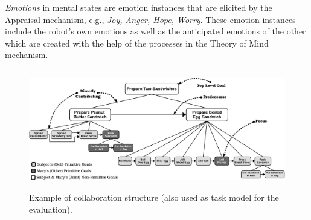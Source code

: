 \documentclass{article}
\begin{document}

\textit{Emotions} in mental states are emotion instances that are elicited by
the Appraisal mechanism, e.g., \textit{Joy, Anger, Hope, Worry}. These emotion
instances include the robot's own emotions as well as the anticipated emotions
of the other which are created with the help of the processes in the Theory of
Mind mechanism. \\


\begin{figure}
  \centering
  \vspace*{-5mm}
  \includegraphics[width=14.5cm,height=5.225cm]{figure/taskModel-croped.pdf}
  \vspace*{-3mm}
  \caption{Example of collaboration structure (also used as task model for
  the evaluation).}
  \label{fig:taskModel}
  \vspace*{-5mm}
\end{figure}
\end{document}
